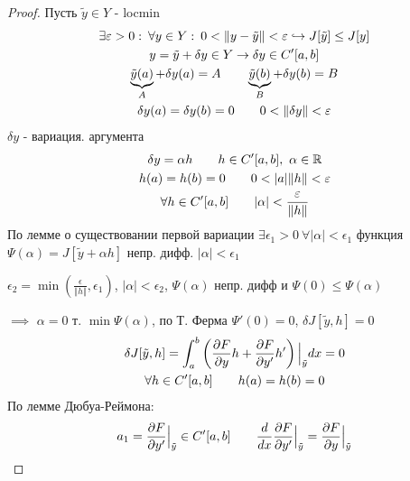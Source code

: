 \documentclass{article}
\begin{document}
\begin{proof}
  Пусть $\tilde{y}\in Y$ - locmin
  \begin{gather*}
    \exists \varepsilon>0 : \: \forall y\in Y: \: 0 < \Vert y-\tilde{y} \Vert < \varepsilon \hookrightarrow J[\tilde{y}] \le J[y]  \\
    y=\tilde{y}+\delta y \in Y \rightarrow \delta y \in C'[a,b] \\ 
    \underbrace{\tilde{y}(a)}_{A}+\delta y(a)=A \qquad \underbrace{\tilde{y}(b)}_{B}+\delta y(b)=B \\ 
    \delta y(a)=\delta y(b)=0 \qquad 0 < \Vert \delta y \Vert < \varepsilon
  \end{gather*}
  $\delta y$ - вариация. аргумента 
  \begin{gather*}
    \delta y=\alpha h \qquad h \in C'[a,b], \  \alpha \in \mathbb{R} \\ 
    h(a)=h(b)=0 \qquad 0 < |a| \Vert h \Vert < \varepsilon \\ 
   \forall h \in C'[a,b] \qquad |\alpha| < \frac{\varepsilon}{\Vert h \Vert}
  \end{gather*}
  По лемме о существовании первой вариации $\exists \epsilon_1 > 0 \ \forall |\alpha| < \epsilon_1$
  функция $\Psi(\alpha)=J[\tilde{y}+\alpha h]$ непр. дифф. $|\alpha| < \epsilon_1$
  
  $\epsilon_2=\min (\frac{\epsilon}{\Vert h \Vert}, \epsilon_1)$, $|\alpha| < \epsilon_2$,
  $\Psi(\alpha)$ непр. дифф и $\Psi(0) \le \Psi(\alpha)$

  $\implies$ $\alpha=0$ т. $\min \Psi(\alpha)$, по Т. Ферма $\Psi'(0)=0$, $\delta J[\tilde{y},h]=0$
  \begin{gather*}
    \delta J[\tilde{y}, h]=\int_{a}^{b}\left(\frac{\partial{F}}{\partial{y}}h+\frac{\partial{F}}{\partial{y'}}h'\right)\Big|_{\tilde{y}}dx=0 \\ 
    \forall h \in C'[a,b] \qquad h(a)=h(b)=0
  \end{gather*}
  По лемме Дюбуа-Реймона:
  \begin{gather*}
    a_1=\frac{\partial{F}}{\partial{y'}}\Big|_{\tilde{y}} \in C'[a,b] \qquad \frac{d}{dx}\frac{\partial{F}}{\partial{y'}}\Big|_{\tilde{y}}=\frac{\partial{F}}{\partial{y}}\Big|_{\tilde{y}}
  \end{gather*}
\end{proof}

\end{document}
